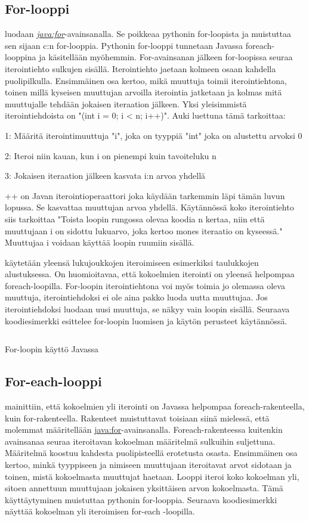\documentclass{tufte-book}
\newcommand{\java}[1]{\underline{\gls{java:#1}}}
\newcommand{\newjava}[1]{\textit{\java{#1}}}
\newcommand{\code}[3]{
\begin{listing}
    \inputminted{java}{OhjelmointiopasEsimerkit/src/#1/#2.java}
    \caption{#3}
    \label{Java-#1-#2}
\end{listing}
}
\begin{document}
\subsection{For-looppi}
\label{for}

 luodaan \newjava{for}-avainsanalla. Se poikkeaa pythonin for-loopista
ja muistuttaa sen sijaan c:n for-looppia. Pythonin for-looppi tunnetaan Javassa foreach-looppina
ja käsitellään myöhemmin. For-avainsanan jälkeen for-loopissa seuraa iterointiehto sulkujen
sisällä. Iterointiehto jaetaan kolmeen osaan kahdella puolipilkulla. Ensimmäinen osa kertoo,
mikä muuttuja toimii iterointiehtona, toinen millä kyseisen muuttujan arvoilla iterointia
jatketaan ja kolmas mitä muuttujalle tehdään jokaisen iteraation jälkeen. Yksi yleisimmistä
iterointiehdoista on "(int i = 0; i < n; i++)". Auki luettuna tämä tarkoittaa:

1: Määritä iterointimuuttuja "i", joka on tyyppiä "int" joka on alustettu arvoksi 0

2: Iteroi niin kauan, kun i on pienempi kuin tavoiteluku n

3: Jokaisen iteraation jälkeen kasvata i:n arvoa yhdellä

++ on Javan iterointioperaattori joka käydään tarkemmin läpi tämän luvun lopussa. Se kasvattaa
muuttujan arvoa yhdellä. Käytännössä koko iterointiehto siis tarkoittaa "Toista loopin rungossa
olevaa koodia n kertaa, niin että muuttujaan i on sidottu lukuarvo, joka kertoo mones iteraatio
on kyseessä." Muuttujaa i voidaan käyttää loopin ruumiin sisällä. 

 käytetään yleensä lukujoukkojen iteroimiseen esimerkiksi taulukkojen
alustuksessa. On huomioitavaa, että kokoelmien iterointi on yleensä helpompaa foreach-loopilla.
For-loopin iterointiehtona voi myös toimia jo olemassa oleva muuttuja, iterointiehdoksi ei ole
aina pakko luoda uutta muuttujaa. Jos iterointiehdoksi luodaan uusi muuttuja, se näkyy vain
loopin sisällä. Seuraava koodiesimerkki esittelee for-loopin luomisen ja käytön perusteet
käytännössä.

\code{week3/basicexamples}{ForLoop}{For-loopin käyttö Javassa}

\subsection{For-each-looppi}
\label{for each}

 mainittiin, että kokoelmien yli iterointi on Javassa
helpompaa foreach-rakenteella, kuin for-rakenteella. Rakenteet muistuttavat toisiaan siinä
mielessä, että molemmat määritellään \java{for}-avainsanalla. Foreach-rakenteessa kuitenkin
avainsanaa seuraa iteroitavan kokoelman määritelmä sulkuihin suljettuna. Määritelmä koostuu
kahdesta puolipisteellä erotetusta osasta. Ensimmäinen osa kertoo, minkä tyyppiseen ja nimiseen
muuttujaan iteroitavat arvot sidotaan ja toinen, mistä kokoelmasta muuttujat haetaan. Looppi
iteroi koko kokoelman yli, sitoen annettuun muuttujaan jokaisen yksittäisen arvon kokoelmasta.
Tämä käyttäytyminen muistuttaa pythonin for-looppia. Seuraava koodiesimerkki näyttää kokoelman
yli iteroimisen for-each -loopilla.
\end{document}
